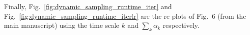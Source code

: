 \documentclass[10pt,journal,compsoc]{IEEEtran}
\begin{document}
Finally, Fig.~\ref{fig:dynamic_sampling_runtime_iter} and Fig.~\ref{fig:dynamic_sampling_runtime_iterlr} are the re-plots of Fig.~6 (from the main manuscript) using the time scale $k$ and $\sum_k \alpha_k$ respectively.


\end{document}
